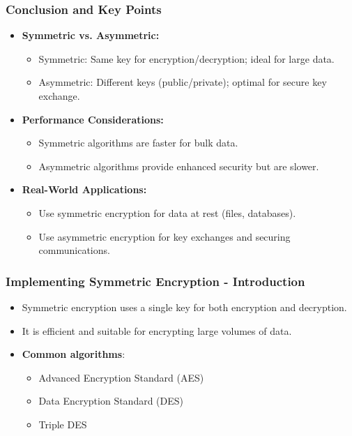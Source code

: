 \documentclass{beamer}
\begin{document}
\begin{frame}[fragile]
    \frametitle{Conclusion and Key Points}
    \begin{itemize}
        \item \textbf{Symmetric vs. Asymmetric:}
            \begin{itemize}
                \item Symmetric: Same key for encryption/decryption; ideal for large data.
                \item Asymmetric: Different keys (public/private); optimal for secure key exchange.
            \end{itemize}
        \item \textbf{Performance Considerations:}
            \begin{itemize}
                \item Symmetric algorithms are faster for bulk data.
                \item Asymmetric algorithms provide enhanced security but are slower.
            \end{itemize}
        \item \textbf{Real-World Applications:}
            \begin{itemize}
                \item Use symmetric encryption for data at rest (files, databases).
                \item Use asymmetric encryption for key exchanges and securing communications.
            \end{itemize}
    \end{itemize}
\end{frame}

\begin{frame}[fragile]
    \frametitle{Implementing Symmetric Encryption - Introduction}
    \begin{itemize}
        \item Symmetric encryption uses a single key for both encryption and decryption.
        \item It is efficient and suitable for encrypting large volumes of data.
        \item \textbf{Common algorithms}: 
        \begin{itemize}
            \item Advanced Encryption Standard (AES) 
            \item Data Encryption Standard (DES) 
            \item Triple DES
        \end{itemize}
    \end{itemize}
\end{frame}
\end{document}
